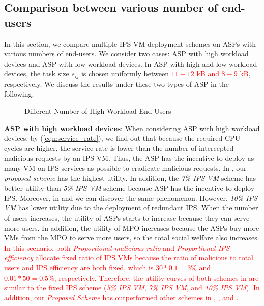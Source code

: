 \documentclass[10pt,journal, compsoc]{IEEEtran}
\begin{document}
\subsection{Comparison between various number of end-users}
In this section, we compare multiple IPS VM deployment schemes on ASPs with various numbers of end-users. We consider two cases: ASP with high workload devices and ASP with low workload devices. In ASP with high and low workload devices, the task size $s_{ij}$ is chosen uniformly between \textcolor{red}{$11 - 12$ kB and $8 - 9$ kB}, respectively. We discuss the results under these two types of ASP in the following. 
\begin{figure}[!]
\captionsetup{justification=centering}
  \hfill
  \hfill
\label{fig:num_cmp_high}
\caption{Different Number of High Workload End-Users}
\end{figure}

\textbf{ASP with high workload devices}: 
When considering ASP with high workload devices, by (\ref{eqn:service_rate}), we find out that because the required CPU cycles are higher, the service rate is lower than the number of intercepted malicious requests by an IPS VM. Thus, the ASP has the incentive to deploy as many VM on IPS services as possible to eradicate malicious requests. In , our \textit{proposed scheme} has the highest utility. In addition, the \textit{7\% IPS VM} scheme has better utility than \textit{5\% IPS VM} scheme because ASP has the incentive to deploy IPS. Moreover, in  and  we can discover the same phenomenon. However, \textit{10\% IPS VM} has lower utility due to the deployment of redundant IPS. When the number of users increases, the utility of ASPs starts to increase because they can serve more users. In addition, the utility of MPO increases because the ASPs buy more VMs from the MPO to serve more users, so the total social welfare also increases. \textcolor{red}{In this scenario, both \textit{Proportional malicious ratio} and \textit{Proportional IPS efficiency} allocate fixed ratio of IPS VMs because the ratio of malicious to total users and IPS efficiency are both fixed, which is $30 * 0.1 = 3\%$ and $0.01 * 50 = 0.5\%$, respectively. Therefore, the utility curves of both schemes in  are similar to the fixed IPS scheme (\textit{5\% IPS VM}, \textit{7\% IPS VM}, and \textit{10\% IPS VM}). In addition, our \textit{Proposed Scheme} has outperformed other schemes in , , and .}
\end{document}
